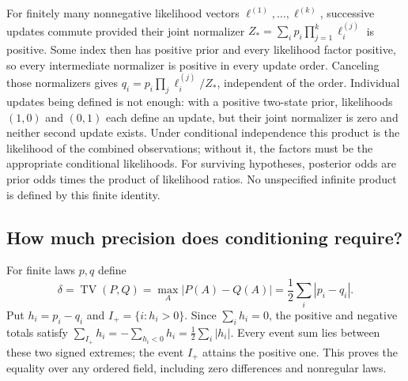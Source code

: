 \documentclass[11pt,a4paper]{article}
\numberwithin{equation}{section}
\theoremstyle{definition}
\theoremstyle{remark}
\newcommand{\TV}{\operatorname{TV}}
\begin{document}
For finitely many nonnegative likelihood vectors $\ell^{(1)},\ldots,
\ell^{(k)}$, successive updates commute provided their joint normalizer
$Z_* = \sum_i p_i\prod_{j=1}^k\ell_i^{(j)}$ is positive.
Some index then has positive prior and every likelihood factor positive,
so every intermediate normalizer is positive in every update order.
Canceling those normalizers gives
$q_i=p_i\prod_j\ell_i^{(j)}/Z_*$, independent of the order.
Individual updates being defined is not enough: with a positive two-state
prior, likelihoods $(1,0)$ and $(0,1)$ each define an update, but their
joint normalizer is zero and neither second update exists.
Under conditional independence this product is the likelihood of the
combined observations; without it, the factors must be the appropriate
conditional likelihoods. For surviving hypotheses, posterior odds are
prior odds times the product of likelihood ratios. No unspecified
infinite product is defined by this finite identity.

\subsection{How much precision does conditioning require?}

For finite laws $p,q$ define
\begin{equation}
 \delta=\TV(P,Q)=\max_A|P(A)-Q(A)|
 =\frac12\sum_i|p_i-q_i|.
\end{equation}
Put $h_i=p_i-q_i$ and $I_+=\{i:h_i>0\}$.
Since $\sum_i h_i=0$, the positive and negative totals satisfy
$\sum_{I_+}h_i=-\sum_{h_i<0}h_i=\tfrac12\sum_i|h_i|$.
Every event sum lies between these two signed extremes; the event $I_+$
attains the positive one. This proves the equality over any ordered field,
including zero differences and nonregular laws.
\end{document}
